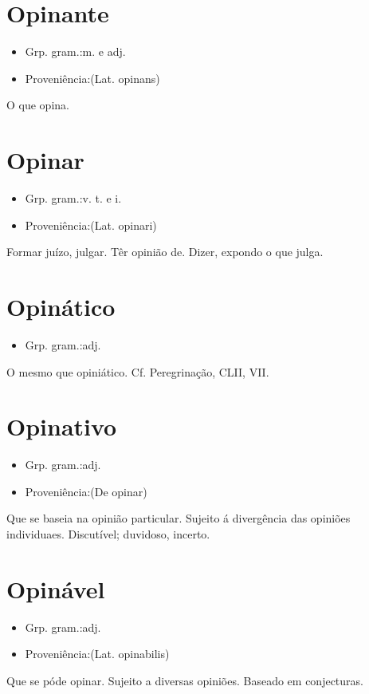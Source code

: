 \section{Opinante}
\begin{itemize}
\item {Grp. gram.:m.  e  adj.}
\end{itemize}
\begin{itemize}
\item {Proveniência:(Lat. \textunderscore opinans\textunderscore )}
\end{itemize}
O que opina.
\section{Opinar}
\begin{itemize}
\item {Grp. gram.:v. t.  e  i.}
\end{itemize}
\begin{itemize}
\item {Proveniência:(Lat. \textunderscore opinari\textunderscore )}
\end{itemize}
Formar juízo, julgar.
Têr opinião de.
Dizer, expondo o que julga.
\section{Opinático}
\begin{itemize}
\item {Grp. gram.:adj.}
\end{itemize}
O mesmo que \textunderscore opiniático\textunderscore . Cf. \textunderscore Peregrinação\textunderscore , CLII, VII.
\section{Opinativo}
\begin{itemize}
\item {Grp. gram.:adj.}
\end{itemize}
\begin{itemize}
\item {Proveniência:(De \textunderscore opinar\textunderscore )}
\end{itemize}
Que se baseia na opinião particular.
Sujeito á divergência das opiniões individuaes.
Discutível; duvidoso, incerto.
\section{Opinável}
\begin{itemize}
\item {Grp. gram.:adj.}
\end{itemize}
\begin{itemize}
\item {Proveniência:(Lat. \textunderscore opinabilis\textunderscore )}
\end{itemize}
Que se póde opinar.
Sujeito a diversas opiniões.
Baseado em conjecturas.
